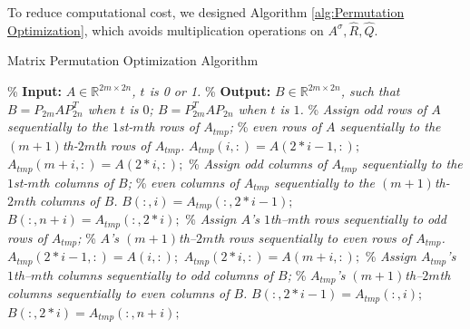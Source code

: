 \documentclass[12pt]{article}
\numberwithin{equation}{section}
\begin{document}
{\color{red}To reduce computational cost, we designed Algorithm \cref{alg:Permutation Optimization}, which avoids multiplication operations on $A^\sigma, \widehat{R}, \widehat{Q}$.}\fi
\begin{algorithm}[htbp]
    \caption{Matrix Permutation Optimization Algorithm}
    \label{alg:Permutation Optimization}
    \begin{algorithmic}[1]
        \State \% \textbf{Input:} \textit{$ A\in \mathbb{R}^{2m\times 2n}$, $t$ is 0 or 1.}
        \State \% \textbf{Output:} \textit{$B \in\mathbb{R}^{2m\times 2n}$, such that $B=P_{2m}AP_{2n}^T$ when $t$ is $0$;  $B=P_{2m}^TAP_{2n}$ when $t$ is $1$.}
        \State
            \State \% \textit{Assign odd rows of $A$ sequentially to the $1$st-$m$th rows of $A_{tmp}$; }
            \State \% \textit{even rows of $A$ sequentially to the $(m+1)$th-$2m$th rows of $A_{tmp}$.}
                \State $A_{tmp}(i, :) = A(2*i-1, :);$
                \State $A_{tmp}(m+i, :) = A(2*i, :);$
            \End
            \State \% \textit{Assign odd columns of $A_{tmp}$ sequentially to the $1$st-$m$th columns of $B$; }
            \State \% \textit{even columns of $A_{tmp}$ sequentially to the $(m+1)$th-$2m$th columns of $B$.}
                \State $B(:, i) = A_{tmp}(:, 2*i-1);$
                \State $B(:, n+i) = A_{tmp}(:, 2*i);$
            \End
        \Else  
            \State \% \textit{Assign $A$'s $1$th--$m$th rows sequentially to odd rows of $A_{tmp}$;}
            \State \% \textit{$A$'s $(m+1)$th--$2m$th rows sequentially to even rows of $A_{tmp}$.}
                \State $A_{tmp}(2*i-1, :) = A(i, :);$
                \State $A_{tmp}(2*i, :) = A(m+i, :);$
            \End
            \State \% \textit{Assign $A_{tmp}$'s $1$th--$m$th columns sequentially to odd columns of $B$;}
            \State \% \textit{$A_{tmp}$'s $(m+1)$th--$2m$th columns sequentially to even columns of $B$.}
                \State $B(:, 2*i-1) = A_{tmp}(:, i);$
                \State $B(:, 2*i) = A_{tmp}(:, n+i);$
            \End
        \End
    \End 
    \end{algorithmic}
\end{algorithm}
\vspace{.3cm}
\end{document}
